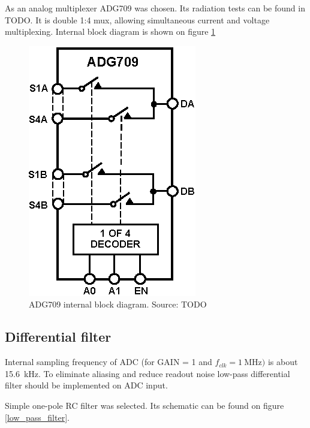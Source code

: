         As an analog multiplexer ADG709 was chosen. Its radiation tests can be found in TODO. It is double 1:4 mux, allowing simultaneous current and voltage multiplexing. Internal block diagram is shown on figure \ref{ADG709_block}

        \begin{figure}[H]
            \centering
            \includegraphics[width=0.3\paperwidth]{img/06/ADG709.eps}
            \caption{ADG709 internal block diagram. Source: TODO}
            \label{ADG709_block}
        \end{figure}

    \subsection{Differential filter}
        Internal sampling frequency of ADC (for GAIN = 1 and $f_{clk} = \SI{1}{\mega\hertz})$ is about \SI{15.6}{\kilo\hertz}. To eliminate aliasing and reduce readout noise low-pass differential filter should be implemented on ADC input.

        Simple one-pole RC filter was selected. Its schematic can be found on figure \ref{low_pass_filter}.

